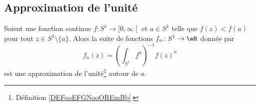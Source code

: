 \subsection{Approximation de l'unité}

\begin{lemma}       \label{LEMooUNFBooRCzwIn}
	Soient une fonction continue \( f\colon S^1\to \mathopen[ 0 , \infty \mathclose[\) et \( a\in S^1\) telle que \( f(z)<f(a)\) pour tout \( z\in S^1\setminus\{ a \}\). Alors la suite de fonctions \( f_n\colon S^1\to \eR\) donnée par
	\begin{equation}        \label{EQooTQYPooLZprJj}
		f_n(z)=\left( \int_{S^1}f^n \right)^{-1}f(z)^n
	\end{equation}
	est une approximation de l'unité\footnote{Définition \ref{DEFooEFGNooOREmBb}.} autour de \( a\).
\end{lemma}

